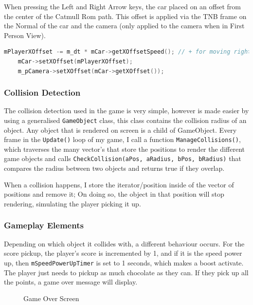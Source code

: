 \documentclass[10pt]{report}
\begin{document}
When pressing the Left and Right Arrow keys, the car placed on an offset from the center of the Catmull Rom path. This offset is applied via the TNB frame on the Normal of the car and the camera (only applied to the camera when in First Person View).
\begin{lstlisting}[language=c]
    mPlayerXOffset -= m_dt * mCar->getXOffsetSpeed(); // + for moving right
    mCar->setXOffset(mPlayerXOffset);
    m_pCamera->setXOffset(mCar->getXOffset());
\end{lstlisting}

\subsubsection*{Collision Detection}
The collision detection used in the  game is very simple, however is made easier by using a generalised \colorbox{mygrey}{\lstinline{GameObject}} class, this class contains the collision radius of an object. Any object that is rendered on screen is a child of GameObject. Every frame in the \colorbox{mygrey}{\lstinline{Update()}} loop of my game, I call a function \colorbox{mygrey}{\lstinline{ManageCollisions()}}, which traverses the many vector's that store the positions to render the different game objects and calls \colorbox{mygrey}{\lstinline{CheckCollision(aPos, aRadius, bPos, bRadius)}} that compares the radius between two objects and returns true if they overlap.

When a collision happens, I store the iterator/position inside of the vector of positions and remove it; On doing so, the object in that position will stop rendering, simulating the player picking it up.

\subsubsection*{Gameplay Elements}
Depending on which object it collides with, a different behaviour occurs. For the score pickup, the player's score is incremented by 1, and if it is the speed power up, then \colorbox{mygrey}{\lstinline{mSpeedPowerUpTimer}} is set to 1 seconds, which makes a boost activate. The player just needs to pickup as much chocolate as they can. If they pick up all the points, a game over message will display.
\begin{figure}[H]
    \centering
    \caption{Game Over Screen}
\end{figure}
\end{document}
